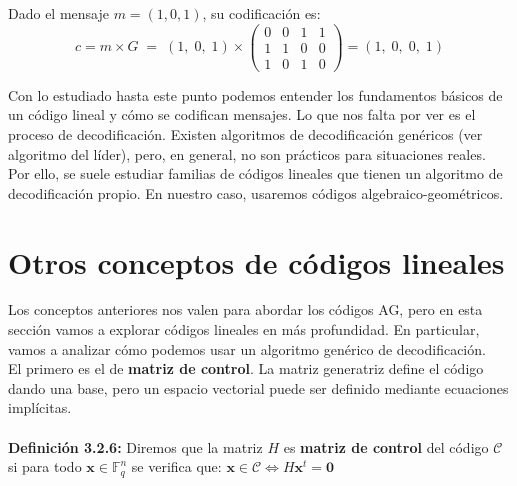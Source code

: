 \documentclass[11pt,spanish]{book}
\begin{document}
Dado el mensaje $m=(1,0,1)$, su codificación es:\\
$$c=m\times G\;=\;(1,\;0,\;1)\times 
\begin{pmatrix}
0 & 0 & 1 & 1\\
1 & 1 & 0 & 0\\
1 & 0 & 1 & 0 
\end{pmatrix}
=(1,\;0,\;0,\;1)$$

Con lo estudiado hasta este punto podemos entender los fundamentos básicos de un código lineal y cómo se codifican mensajes. Lo que nos falta por ver es el proceso de decodificación. Existen algoritmos de decodificación genéricos (ver algoritmo del líder), pero, en general, no son prácticos para situaciones reales. Por ello, se suele estudiar familias de códigos lineales que tienen un algoritmo de decodificación propio. En nuestro caso, usaremos códigos algebraico-geométricos. 
\section{Otros conceptos de códigos lineales}
Los conceptos anteriores nos valen para abordar los códigos AG, pero en esta sección vamos a explorar códigos lineales en más profundidad. En particular, vamos a analizar cómo podemos usar un algoritmo genérico de decodificación.\\

El primero es el de \textbf{matriz de control}. La matriz generatriz define el código dando una base, pero un espacio vectorial puede ser definido mediante ecuaciones implícitas.\\
\\ \textbf{Definición 3.2.6: } Diremos que la matriz $H$ es \textbf{matriz de control} del código $\mathcal{C}$ si para todo $\mathbf{x}\in\mathbb{F}_{q}^{n}$ se verifica que: $\mathbf{x}\in \mathcal{C}\Longleftrightarrow H\mathbf{x}^{t}=\mathbf{0}$\\
\end{document}

